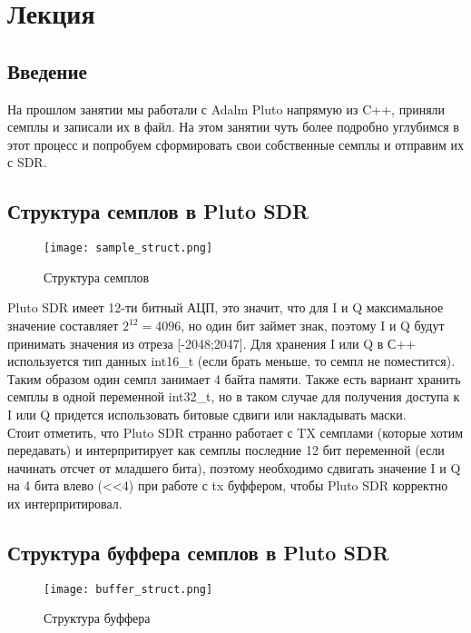 \chapter{Лекция}
\label{ch:intro}

\section*{\textbf{Введение}}

На прошлом занятии мы работали с Adalm Pluto напрямую из C++, приняли семплы и записали их в файл. На этом занятии чуть более подробно углубимся в этот процесс и попробуем
сформировать свои собственные семплы и отправим их с SDR.

\section*{\textbf{Структура семплов в Pluto SDR}}

\begin{figure}[H]
    \centering
    \texttt{[image: sample\_struct.png]}
    \caption{Структура семплов}
\end{figure}

Pluto SDR имеет 12-ти битный АЦП, это значит, что для I и Q максимальное значение составляет $2^12 = 4096$, но один бит займет знак, поэтому I и Q будут принимать значения
из отреза [-2048;2047]. Для хранения I или Q в С++ используется тип данных int16\_t (если брать меньше, то семпл не поместится). Таким образом один семпл занимает 4 байта
памяти. Также есть вариант хранить семплы в одной переменной int32\_t, но в таком случае для получения доступа к I или Q придется использовать битовые сдвиги или накладывать
маски. \\

Стоит отметить, что Pluto SDR странно работает с TX семплами (которые хотим передавать) и интерпритирует как семплы последние 12 бит переменной (если начинать отсчет от
младшего бита), поэтому необходимо сдвигать значение I и Q на 4 бита влево (<<4) при работе с tx буффером, чтобы Pluto SDR корректно их интерпритировал. 

\section*{\textbf{Структура буффера семплов в Pluto SDR}}

\begin{figure}[H]
    \centering
    \texttt{[image: buffer\_struct.png]}
    \caption{Структура буффера}
\end{figure}

